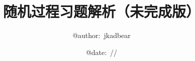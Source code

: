 \documentclass[a4paper,11pt]{ctexbook}
\renewcommand{\today}{\number\month/\number\day/\number\year}
\begin{document}
\author{@author:~jkadbear}
\title{随机过程习题解析（未完成版）}
\date{@date:~\today}

	\maketitle


	
	
	
	
\end{document}

